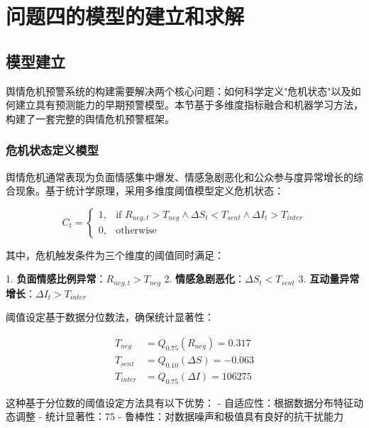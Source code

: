 \documentclass[withoutpreface,bwprint]{cumcmthesis}
\begin{document}

\section{问题四的模型的建立和求解}
\subsection{模型建立}

舆情危机预警系统的构建需要解决两个核心问题：如何科学定义"危机状态"以及如何建立具有预测能力的早期预警模型。本节基于多维度指标融合和机器学习方法，构建了一套完整的舆情危机预警框架。

\subsubsection{危机状态定义模型}

舆情危机通常表现为负面情感集中爆发、情感急剧恶化和公众参与度异常增长的综合现象。基于统计学原理，采用多维度阈值模型定义危机状态：

\begin{equation}
\label{eq:crisis_definition}
C_t = \begin{cases}
1, & \text{if } R_{neg,t} > T_{neg} \land \Delta S_t < T_{sent} \land \Delta I_t > T_{inter} \\
0, & \text{otherwise}
\end{cases}
\end{equation}

其中，危机触发条件为三个维度的阈值同时满足：

1. \textbf{负面情感比例异常}：$R_{neg,t} > T_{neg}$
2. \textbf{情感急剧恶化}：$\Delta S_t < T_{sent}$  
3. \textbf{互动量异常增长}：$\Delta I_t > T_{inter}$

阈值设定基于数据分位数法，确保统计显著性：

\begin{equation}
\label{eq:threshold_calculation}
\begin{aligned}
T_{neg} &= Q_{0.75}(R_{neg}) = 0.317 \\
T_{sent} &= Q_{0.10}(\Delta S) = -0.063 \\
T_{inter} &= Q_{0.75}(\Delta I) = 106275
\end{aligned}
\end{equation}

这种基于分位数的阈值设定方法具有以下优势：
- 自适应性：根据数据分布特征动态调整
- 统计显著性：75%
- 鲁棒性：对数据噪声和极值具有良好的抗干扰能力
\end{document}
